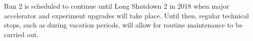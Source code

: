Run 2 is scheduled to continue until Long Shutdown 2 in 2018 when major accelerator and experiment upgrades
will take place. Until then, regular technical stops, such as during vacation periods, will allow for routine
maintenance to be carried out.

